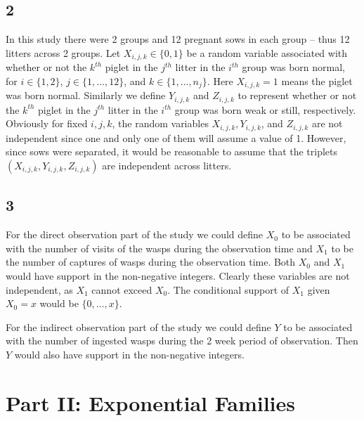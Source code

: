 \documentclass[12pt]{article}
\begin{document}
\subsection*{2}
In this study there were 2 groups and 12 pregnant sows in each group -- thus 12 litters across 2 groups. Let $X_{i,j,k} \in \{0,1\}$ be a random
variable associated with whether or not
the $k^{th}$ piglet in the $j^{th}$ litter in the $i^{th}$ group was born normal, for $i \in \{1, 2\}$, $j \in \{1, \dots, 12\}$, and $k \in \{1,
\dots, n_{j}\}$. Here $X_{i,j,k} = 1$ means the piglet was born normal. Similarly we define $Y_{i,j,k}$ and $Z_{i,j,k}$ to represent whether or not 
the $k^{th}$ piglet in the $j^{th}$ litter in the $i^{th}$ group was born weak or still, respectively. Obviously for fixed $i, j, k$, the random
variables $X_{i,j,k}, Y_{i,j,k}$, and $Z_{i,j,k}$ are not independent since one and only one of them will assume a value of 1. However, since sows
were separated, it would be reasonable to assume that the triplets $(X_{i,j,k}, Y_{i,j,k}, Z_{i,j,k})$ are independent across litters.



\subsection*{3}
For the direct observation part of the study we could define $X_{0}$ to be associated with the number of visits of the wasps during the observation
time and $X_{1}$ to be the number of captures of wasps during the observation time. Both $X_0$ and $X_1$ would have support in the non-negative integers.
Clearly these variables are not independent, as $X_1$ cannot exceed $X_0$. The conditional support of $X_1$ given $X_0 = x$ would be $\{0,\dots, x\}$.

For the indirect observation part of the study we could define $Y$ to be associated with the number of ingested wasps during the 2 week period of
observation. Then $Y$ would also have support in the non-negative integers.


\newpage
\section*{Part II: Exponential Families}
\end{document}
